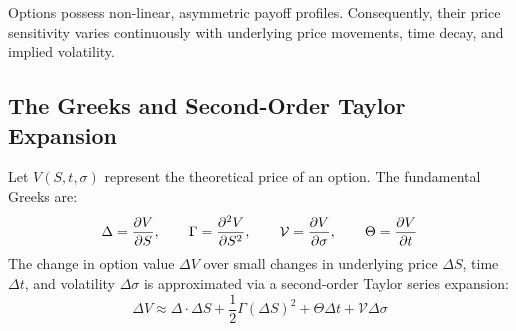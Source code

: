 Options possess non-linear, asymmetric payoff profiles. Consequently, their price sensitivity varies continuously with underlying price movements, time decay, and implied volatility.

\subsection{The Greeks and Second-Order Taylor Expansion}

Let $V(S, t, \sigma)$ represent the theoretical price of an option. The fundamental Greeks are:
\begin{equation}
\Delta = \frac{\partial V}{\partial S}, \qquad \Gamma = \frac{\partial^2 V}{\partial S^2}, \qquad \mathcal{V} = \frac{\partial V}{\partial \sigma}, \qquad \Theta = \frac{\partial V}{\partial t}
\end{equation}
The change in option value $\Delta V$ over small changes in underlying price $\Delta S$, time $\Delta t$, and volatility $\Delta \sigma$ is approximated via a second-order Taylor series expansion:
\begin{equation}
\Delta V \approx \Delta \cdot \Delta S + \frac{1}{2} \Gamma (\Delta S)^2 + \Theta \Delta t + \mathcal{V} \Delta \sigma
\end{equation}

